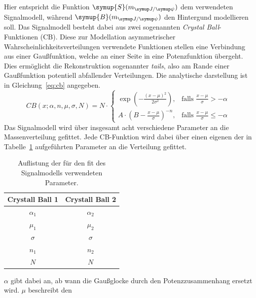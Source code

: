 %
Hier entspricht die Funktion $\symup{S}(m_{\jpsi})$ dem verwendeten Signalmodell, während $\symup{B}(m_{\jpsi})$ den Hintergund modellieren soll. Das Signalmodell besteht dabei aus zwei sogenannten \textit{Crystal Ball}-Funktionen (CB). Diese zur Modellation asymmetrischer Wahrscheinlichkeitsverteilungen verwendete Funktionen stellen eine Verbindung aus einer Gaußfunktion, welche an einer Seite in eine Potenzfunktion übergeht. Dies ermöglicht die Rekonstruktion sogenannter \textit{tails}, also am Rande einer Gaußfunktion potentiell abfallender Verteilungen. Die analytische darstellung ist in Gleichung~\ref{eq:cb} angegeben.
%
\begin{equation}
  {\displaystyle CB(x;\alpha ,n,{\mu},\sigma,N)=N\cdot {\begin{cases}\exp \left(-{\frac {(x-{\mu})^{2}}{2\sigma ^{2}}}\right),&{\mbox{falls }}{\frac {x-{\mu}}{\sigma }}>-\alpha \\A\cdot \left(B-{\frac {x-{\mu}}{\sigma }}\right)^{-n},&{\mbox{falls }}{\frac {x-{\mu}}{\sigma }}\leqslant -\alpha \end{cases}}}
  \label{eq:cb}
\end{equation}
%
Das Signalmodell wird über insgesamt acht verschiedene Parameter an die Massenverteilung gefittet. Jede CB-Funktion wird dabei über einen eigenen der in Tabelle~\ref{tab:params} aufgeführten Parameter an die Verteilung gefittet.
%
\begin{table}[htb]
  \centering
  \caption{Auflistung der für den fit des Signalmodells verwendeten Parameter.}
  \begin{tabular}{cc}
    \toprule
    \textbf{Crystall Ball 1}    & \textbf{Crystall Ball 2} \\
    \midrule
    $\alpha_1$                  & $\alpha_2$  \\
    $\mu_1$                     & $\mu_2$     \\
    $\sigma$                    & $\sigma$    \\
    $n_1$                       & $n_2$       \\
    $N$                         & $N$         \\
    \bottomrule
  \end{tabular}
  \label{tab:params}
\end{table}
%
$\alpha$ gibt dabei an, ab wann die Gaußglocke durch den Potenzzusammenhang ersetzt wird. $\mu$ beschreibt den
